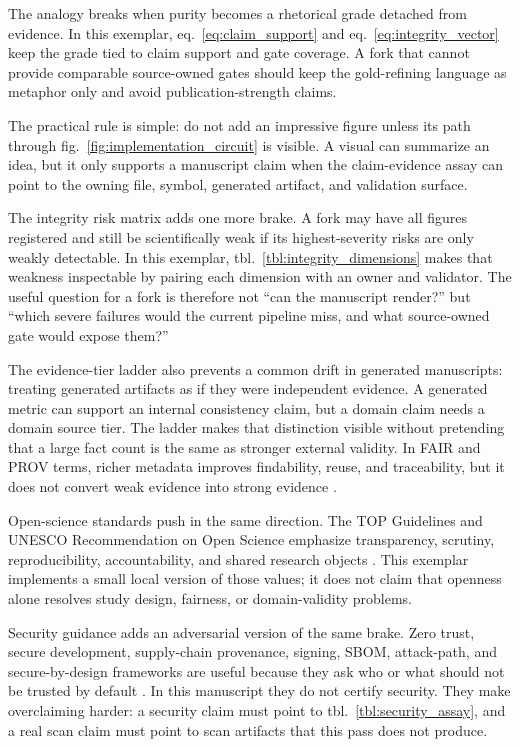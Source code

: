 \documentclass[
]{article}
\begin{document}
The analogy breaks when purity becomes a rhetorical grade detached from
evidence. In this exemplar, eq.~\ref{eq:claim_support} and
eq.~\ref{eq:integrity_vector} keep the grade tied to claim support and
gate coverage. A fork that cannot provide comparable source-owned gates
should keep the gold-refining language as metaphor only and avoid
publication-strength claims.

The practical rule is simple: do not add an impressive figure unless its
path through fig.~\ref{fig:implementation_circuit} is visible. A visual
can summarize an idea, but it only supports a manuscript claim when the
claim-evidence assay can point to the owning file, symbol, generated
artifact, and validation surface.

The integrity risk matrix adds one more brake. A fork may have all
figures registered and still be scientifically weak if its
highest-severity risks are only weakly detectable. In this exemplar,
tbl.~\ref{tbl:integrity_dimensions} makes that weakness inspectable by
pairing each dimension with an owner and validator. The useful question
for a fork is therefore not ``can the manuscript render?'' but ``which
severe failures would the current pipeline miss, and what source-owned
gate would expose them?''

The evidence-tier ladder also prevents a common drift in generated
manuscripts: treating generated artifacts as if they were independent
evidence. A generated metric can support an internal consistency claim,
but a domain claim needs a domain source tier. The ladder makes that
distinction visible without pretending that a large fact count is the
same as stronger external validity. In FAIR and PROV terms, richer
metadata improves findability, reuse, and traceability, but it does not
convert weak evidence into strong evidence
\citep{wilkinson2016fair, moreau2013prov}.

Open-science standards push in the same direction. The TOP Guidelines
and UNESCO Recommendation on Open Science emphasize transparency,
scrutiny, reproducibility, accountability, and shared research objects
\citep{nosek2015top, unesco2021_open_science}. This exemplar implements
a small local version of those values; it does not claim that openness
alone resolves study design, fairness, or domain-validity problems.

Security guidance adds an adversarial version of the same brake. Zero
trust, secure development, supply-chain provenance, signing, SBOM,
attack-path, and secure-by-design frameworks are useful because they ask
who or what should not be trusted by default
\citep{nist_sp800_207_zero_trust, nist_sp800_218_ssdf, slsa_v1_2, sigstore_docs, mitre_attack, cyclonedx_spec, spdx_spec, cisa_secure_by_design}.
In this manuscript they do not certify security. They make overclaiming
harder: a security claim must point to tbl.~\ref{tbl:security_assay},
and a real scan claim must point to scan artifacts that this pass does
not produce.
\end{document}
